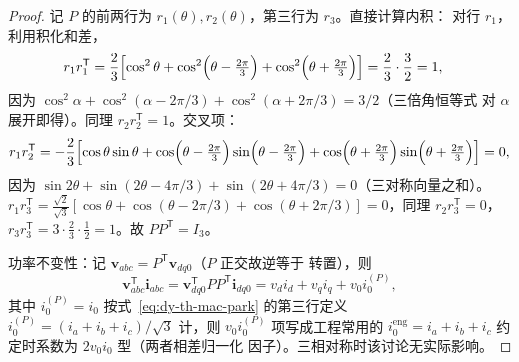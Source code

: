 \begin{proof}
记 $P$ 的前两行为 $r_1(\theta),r_2(\theta)$，第三行为 $r_3$。直接计算内积：
对行 $r_1$，利用积化和差，
\begin{align}
r_1r_1^{\mathsf T}
&=\frac{2}{3}\Bigl[\cos^2\theta+\cos^2\Bigl(\theta-\tfrac{2\pi}{3}\Bigr)
+\cos^2\Bigl(\theta+\tfrac{2\pi}{3}\Bigr)\Bigr]
=\frac{2}{3}\cdot\frac{3}{2}=1,
\end{align}
因为 $\cos^2\alpha+\cos^2(\alpha-2\pi/3)+\cos^2(\alpha+2\pi/3)=3/2$（三倍角恒等式
对 $\alpha$ 展开即得）。同理 $r_2r_2^{\mathsf T}=1$。交叉项：
\begin{equation}
r_1r_2^{\mathsf T}
=-\frac{2}{3}\Bigl[\cos\theta\sin\theta
+\cos\Bigl(\theta-\tfrac{2\pi}{3}\Bigr)\sin\Bigl(\theta-\tfrac{2\pi}{3}\Bigr)
+\cos\Bigl(\theta+\tfrac{2\pi}{3}\Bigr)\sin\Bigl(\theta+\tfrac{2\pi}{3}\Bigr)\Bigr]
=0,
\end{equation}
因为 $\sin2\theta+\sin(2\theta-4\pi/3)+\sin(2\theta+4\pi/3)=0$（三对称向量之和）。
$r_1r_3^{\mathsf T}=\frac{\sqrt2}{\sqrt3}[\cos\theta+\cos(\theta-2\pi/3)
+\cos(\theta+2\pi/3)]=0$，同理 $r_2r_3^{\mathsf T}=0$，$r_3r_3^{\mathsf T}=
3\cdot\frac{2}{3}\cdot\frac12=1$。故 $PP^{\mathsf T}=I_3$。

功率不变性：记 $\mathbf v_{abc}=P^{\mathsf T}\mathbf v_{dq0}$（$P$ 正交故逆等于
转置），则
\begin{equation}
\mathbf v_{abc}^{\mathsf T}\mathbf i_{abc}
=\mathbf v_{dq0}^{\mathsf T}PP^{\mathsf T}\mathbf i_{dq0}
=v_di_d+v_qi_q+v_0i_0^{(P)},
\end{equation}
其中 $i_0^{(P)}=i_0$ 按式~\eqref{eq:dy-th-mac-park} 的第三行定义
$i_0^{(P)}=(i_a+i_b+i_c)/\sqrt3$ 计，则 $v_0i_0^{(P)}$ 项写成工程常用的
$i_0^{\mathrm{eng}}=i_a+i_b+i_c$ 约定时系数为 $2v_0i_0$ 型（两者相差归一化
因子）。三相对称时该讨论无实际影响。
\end{proof}

